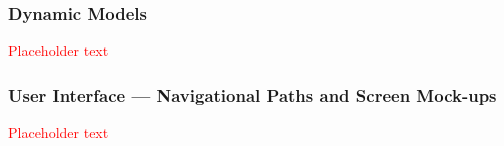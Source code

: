 \documentclass[a4paper, 11pt, titlepage]{article}
\begin{document}
\subsubsection{Dynamic Models}
\textcolor{red}{Placeholder text}

\subsubsection{User Interface --- Navigational Paths and Screen Mock-ups}
\textcolor{red}{Placeholder text}

\lipsum

%
%

%
\end{document}
